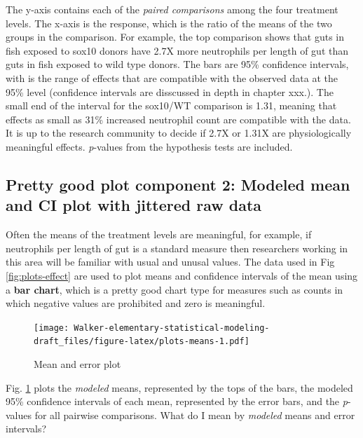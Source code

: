 \documentclass[]{book}
\begin{document}
The y-axis contains each of the \emph{paired comparisons} among the four
treatment levels. The x-axis is the response, which is the ratio of the
means of the two groups in the comparison. For example, the top
comparison shows that guts in fish exposed to sox10 donors have 2.7X
more neutrophils per length of gut than guts in fish exposed to wild
type donors. The bars are 95\% confidence intervals, with is the range
of effects that are compatible with the observed data at the 95\% level
(confidence intervals are disscussed in depth in chapter xxx.). The
small end of the interval for the sox10/WT comparison is 1.31, meaning
that effects as small as 31\% increased neutrophil count are compatible
with the data. It is up to the research community to decide if 2.7X or
1.31X are physiologically meaningful effects. \emph{p}-values from the
hypothesis tests are included.

\subsection{Pretty good plot component 2: Modeled mean and CI plot with
jittered raw
data}\label{pretty-good-plot-component-2-modeled-mean-and-ci-plot-with-jittered-raw-data}

Often the means of the treatment levels are meaningful, for example, if
neutrophils per length of gut is a standard measure then researchers
working in this area will be familiar with usual and unusal values. The
data used in Fig \ref{fig:plots-effect} are used to plot means and
confidence intervals of the mean using a \textbf{bar chart}, which is a
pretty good chart type for measures such as counts in which negative
values are prohibited and zero is meaningful.

\begin{figure}
\centering
\texttt{[image: Walker-elementary-statistical-modeling-draft\_files/figure-latex/plots-means-1.pdf]}
\caption{\label{fig:plots-means}Mean and error plot}
\end{figure}

Fig. \ref{fig:plots-means} plots the \emph{modeled} means, represented
by the tops of the bars, the modeled 95\% confidence intervals of each
mean, represented by the error bars, and the \emph{p}-values for all
pairwise comparisons. What do I mean by \emph{modeled} means and error
intervals?
\end{document}
